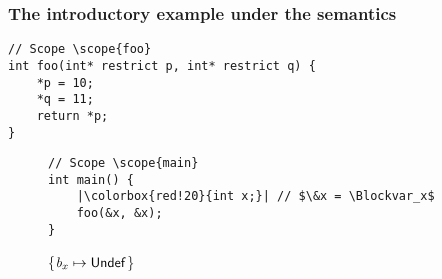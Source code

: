 \begin{frame}[fragile]
\frametitle{The introductory example under the \cinkrestrict semantics}
\begin{verbatim}
// Scope \scope{foo}
int foo(int* restrict p, int* restrict q) {   
    *p = 10;
    *q = 11;
    return *p;
}
\end{verbatim}

\begin{figure}[h]
\centering
\begin{minipage}{.33\textwidth}
\begin{verbatim}
// Scope \scope{main}
int main() {
    |\colorbox{red!20}{int x;}| // $\&x = \Blockvar_x$
    foo(&x, &x);
}
\end{verbatim}
\end{minipage}%
\begin{minipage}{.67\textwidth}
\executionannotation
{
\{\colorbox{red!20}{$\textit{b}_x \mapsto \mathsf{Undef}$}\}
}
{
}
\end{minipage}
\end{figure}

\end{frame}



